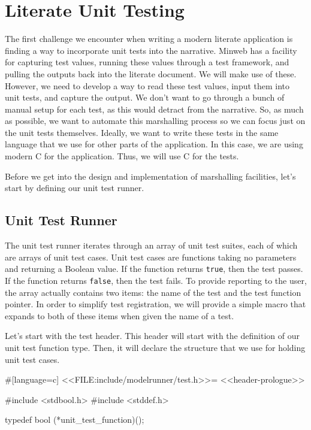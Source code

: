 \section{Literate Unit Testing}

The first challenge we encounter when writing a modern literate application is
finding a way to incorporate unit tests into the narrative. Minweb has a
facility for capturing test values, running these values through a test
framework, and pulling the outputs back into the literate document.  We will
make use of these.  However, we need to develop a way to read these test values,
input them into unit tests, and capture the output.  We don't want to go through
a bunch of manual setup for each test, as this would detract from the narrative.
So, as much as possible, we want to automate this marshalling process so we can
focus just on the unit tests themselves. Ideally, we want to write these tests
in the same language that we use for other parts of the application.  In this
case, we are using modern C for the application.  Thus, we will use C for the
tests.

Before we get into the design and implementation of marshalling facilities,
let's start by defining our unit test runner.

\subsection{Unit Test Runner}

The unit test runner iterates through an array of unit test suites, each of
which are arrays of unit test cases.  Unit test cases are functions taking no
parameters and returning a Boolean value. If the function returns \verb/true/,
then the test passes. If the function returns \verb/false/, then the test fails.
To provide reporting to the user, the array actually contains two items: the
name of the test and the test function pointer. In order to simplify test
registration, we will provide a simple macro that expands to both of these items
when given the name of a test.

Let's start with the test header.  This header will start with the definition of
our unit test function type.  Then, it will declare the structure that we use
for holding unit test cases.

#[language=c]
<<FILE:include/modelrunner/test.h>>=
<<header-prologue>>

#include <stdbool.h>
#include <stddef.h>

typedef bool (*unit_test_function)();


